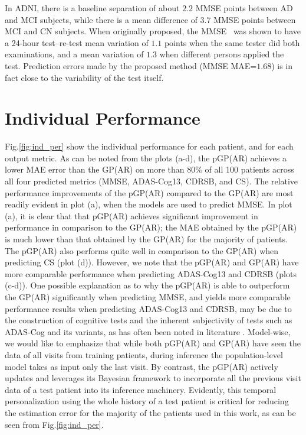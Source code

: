 \documentclass{article}
\begin{document}

In ADNI, there is a baseline separation of about $2.2$ MMSE points between AD and MCI subjects, while there is a mean difference of $3.7$ MMSE points between MCI and CN subjects. When originally proposed, the MMSE~\cite{folstein1975mini} was shown to have a 24-hour test–re-test mean variation of $1.1$ points when the same tester did both examinations, and a mean variation of $1.3$ when different persons applied the test. Prediction errors made by the proposed method (MMSE MAE=$1.68$) is in fact close to the variability of the test itself.

\section{Individual Performance}
Fig.\ref{fig:ind_per} show the individual performance for each patient, and for each output metric. As can be noted from the plots (a-d), the pGP(AR) achieves a lower MAE error than the GP(AR) on more than $80\%$ of all 100 patients across all four predicted metrics (MMSE, ADAS-Cog13, CDRSB, and CS). The relative performance improvements of the pGP(AR) compared to the GP(AR) are most readily evident in plot (a), when the models are used to predict MMSE. In plot (a), it is clear that that pGP(AR) achieves significant improvement in performance in comparison to the GP(AR); the MAE obtained by the pGP(AR) is much lower than that obtained by the GP(AR) for the majority of patients. The pGP(AR) also performs quite well in comparison to the GP(AR) when predicting CS (plot (d)). However, we note that the pGP(AR) and GP(AR) have more comparable performance when predicting ADAS-Cog13 and CDRSB (plots (c-d)). One possible explanation as to why the pGP(AR) is able to outperform the GP(AR) significantly when predicting MMSE, and yields more comparable performance results when predicting ADAS-Cog13 and CDRSB, may be due to the construction of cognitive tests and the inherent subjectivity of tests such as ADAS-Cog and its variants, as has often been noted in literature \cite{mohs1997}. Model-wise, we would like to emphasize that while both pGP(AR) and GP(AR) have seen the data of all visits from training patients, during inference the population-level model takes as input only the last visit. By contrast, the pGP(AR) actively updates and leverages its Bayesian framework to incorporate all the previous visit data of a test patient into its inference machinery. Evidently, this temporal personalization using the whole history of a test patient is critical for reducing the estimation error for the majority of the patients used in this work, as can be seen from Fig.\ref{fig:ind_per}.
\end{document}
